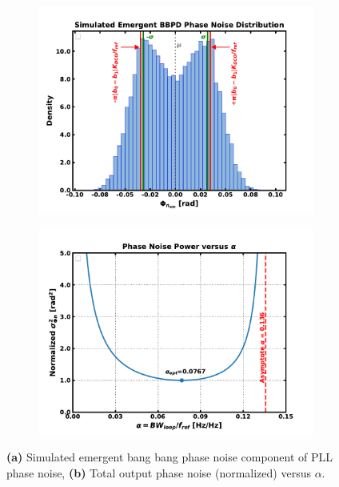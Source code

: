 	\begin{figure}[htb!]
	    \centering
	    \begin{subfigure}{0.5\textwidth}
	        \centering
	        \includegraphics[width=1\textwidth, angle=0]{./figs/design/em_bb_pn}
	        \caption{ }
	        \label{fig:em_bb_pn}
	    \end{subfigure}%
	    \begin{subfigure}{0.5\textwidth}
	        \centering
	        \includegraphics[width=1\textwidth, angle=0]{./figs/design/opt_alpha_full}
	        \caption{ }
	        \label{fig:opt_alpha_full}
	    \end{subfigure}
	    \label{fig:alph_opt}
	    \caption{\textbf{(a)} Simulated emergent bang bang phase noise component of PLL phase noise, \textbf{(b)} Total output phase noise (normalized) versus $\alpha$.}
	\end{figure} 

